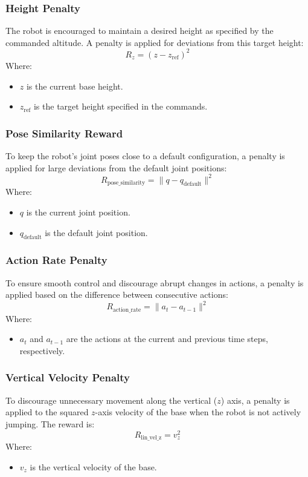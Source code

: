 \subsubsection{Height Penalty}

The robot is encouraged to maintain a desired height as specified by the commanded altitude. A penalty is applied for deviations from this target height:
\[
R_{z} = (z - z_{\text{ref}})^2
\]
Where:
\begin{itemize}
	\item $z$ is the current base height.
	\item $z_{\text{ref}}$ is the target height specified in the commands.
\end{itemize}

\subsubsection{Pose Similarity Reward}

To keep the robot's joint poses close to a default configuration, a penalty is applied for large deviations from the default joint positions:
\[
R_{\text{pose\_similarity}} = \|q - q_{\text{default}}\|^2
\]
Where:
\begin{itemize}
	\item $q$ is the current joint position.
	\item $q_{\text{default}}$ is the default joint position.
\end{itemize}

\subsubsection{Action Rate Penalty}

To ensure smooth control and discourage abrupt changes in actions, a penalty is applied based on the difference between consecutive actions:
\[
R_{\text{action\_rate}} = \|a_{t} - a_{t-1}\|^2
\]
Where:
\begin{itemize}
	\item $a_t$ and $a_{t-1}$ are the actions at the current and previous time steps, respectively.
\end{itemize}

\subsubsection{Vertical Velocity Penalty}

To discourage unnecessary movement along the vertical ($z$) axis, a penalty is applied to the squared $z$-axis velocity of the base when the robot is not actively jumping. The reward is:
\[
R_{\text{lin\_vel\_z}} = v_{z}^2
\]
Where:
\begin{itemize}
	\item $v_{z}$ is the vertical velocity of the base.
\end{itemize}

